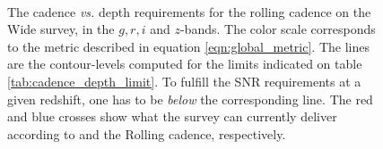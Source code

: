\documentclass[\docopts]{\docclass}
\begin{document}
\begin{figure}[t]
\begin{center}
\\
\caption{The cadence {\em vs.} depth requirements for the rolling cadence on the Wide survey,
  in the $g, r, i $ and $z$-bands. The color scale corresponds to the
  metric described in equation \ref{eqn:global_metric}.  The lines are
  the contour-levels computed for the limits indicated on table
  \ref{tab:cadence_depth_limit}. To fulfill the SNR requirements at a
  given redshift, one has to be {\em below} the corresponding
  line. The red and blue crosses show what the survey can currently
  deliver according to  and the Rolling cadence, respectively.}
\label{fig:m5_cadence_limits_rolling}
\end{center}
\end{figure}
\end{document}

